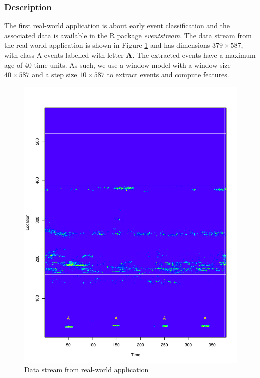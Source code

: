 \documentclass[11pt]{article}
\begin{document}
	\subsubsection{Description}
 	The first real-world application is about early event classification and the associated data is available in the R package {\it eventstream}. The data stream from the real-world application is shown in Figure \ref{fig:Real_World_Data_Stream}  and has dimensions $379  \times 587 $, with class A events labelled with letter {\bf A}. The extracted events have a maximum age of 40 time units. As such, we use a window model with a window size $40 \times 587$ and a step size $ 10 \times 587$ to extract events and compute features. 
 	\begin{figure}[!ht]
 		\centering
 		\includegraphics[scale=0.5]{./Graphics/Real_World_stream.pdf} 
 		\caption{\footnotesize Data stream from real-world application}
 		\label{fig:Real_World_Data_Stream}
 	\end{figure}
 	
\end{document}
